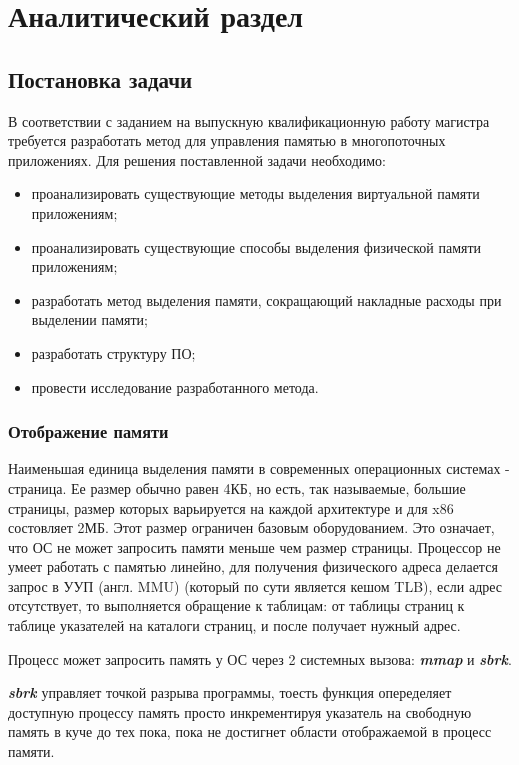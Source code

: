 \chapter{Аналитический раздел}
\label{cha:analysis}
\section{Постановка задачи}
В соответствии с заданием на выпускную квалификационную работу магистра требуется разработать метод для управления памятью в многопоточных приложениях.
Для решения поставленной задачи необходимо:
\begin{itemize}
	\item проанализировать существующие методы выделения виртуальной памяти приложениям;
	\item проанализировать существующие способы выделения физической памяти приложениям;
	\item разработать метод выделения памяти, сокращающий накладные расходы при выделении памяти;
	\item разработать структуру ПО;
	\item провести исследование разработанного метода.
\end{itemize}

\subsection{Отображение памяти}
Наименьшая единица выделения памяти в современных операционных системах - страница\cite{page}. Ее размер обычно равен 4КБ, но есть, так называемые, большие страницы, размер которых варьируется на каждой архитектуре и для x86 состовляет 2МБ. Этот размер ограничен базовым оборудованием. Это означает, что ОС не может запросить памяти меньше чем размер страницы. Процессор не умеет работать с памятью линейно, для получения физического адреса делается запрос в УУП (англ. MMU)\cite{mmu}  (который   по   сути является кешом TLB)\cite{tlb}, если адрес отсутствует, то выполняется обращение к таблицам: от таблицы страниц к таблице указателей на каталоги страниц, и после получает нужный адрес.\cite{wepskam}

Процесс может запросить память у ОС через 2 системных вызова: \textbf{\textit{mmap}}\cite{mmap} и \textbf{\textit{sbrk}}\cite{sbrk}.

\textbf{\textit{sbrk}} управляет точкой разрыва программы, тоесть функция опеределяет доступную процессу память просто инкрементируя указатель на свободную память в куче\cite{heap} до тех пока, пока не достигнет области отображаемой в процесс памяти.

